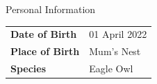 \documentclass[withoutsidebar]{stylishcv} %
\begin{document}

	



	
	
	

		\vspace{-1.5cm}
		\begin{flushright}
			\begin{minipage}[t]{0.75\textwidth}
				\begin{center}
					\begin{shadedcvbox}Personal Information\end{shadedcvbox}
				\end{center}
				\begin{tabular}{L{5cm}  R{8cm}}
					\textbf{Date of Birth}& 01 April 2022\\
					\textbf{Place of Birth} & Mum's Nest\\
					\textbf{Species} & Eagle Owl\\
				\end{tabular}
				\smallskip
			\end{minipage}
		\end{flushright}

		
\end{document}
